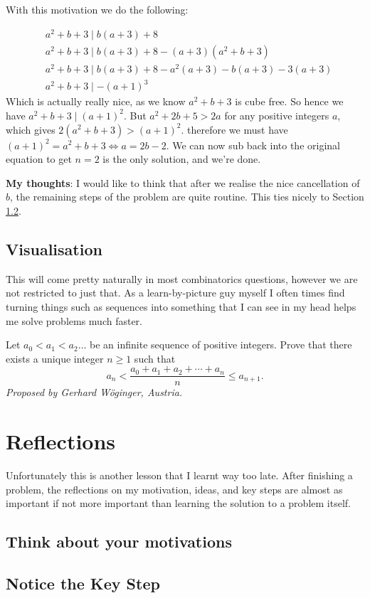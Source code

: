 \documentclass{article}
\theoremstyle{mytheoremstyle}
\theoremstyle{mytheoremstyle}
\theoremstyle{myproblemstyle}
\theoremstyle{myproblemstyle}
\begin{document}
    \begin{center}
    \end{center}

    With this motivation we do the following:

    \begin{align*}
        &a^2 + b + 3 \mid b(a+3) + 8 \\
        &a^2 + b + 3 \mid b(a+3) + 8 - (a+3)(a^2 + b + 3)\\
        &a^2 + b + 3 \mid b(a+3) + 8 - a^2(a+3) - b(a+3) - 3(a+3)\\
        &a^2 + b + 3 \mid -(a+1)^3
    \end{align*}
    Which is actually really nice, as we know $a^2 + b + 3$ is cube free. So hence we have $a^2 + b + 3 \mid (a+1)^2$. But $a^2 + 2b + 5 > 2a$ for any positive integers $a$, which gives $2(a^2 + b + 3) > (a+1)^2$. therefore we must have $(a+1)^2 = a^2 + b + 3 \iff a = 2b - 2$. We can now sub back into the original equation to get $n=2$ is the only solution, and we're done.

    \textbf{My thoughts}: I would like to think that after we realise the nice cancellation of $b$, the remaining steps of the problem are quite routine. This ties nicely to Section \ref{keystep}.

    \subsection{Visualisation}
    This will come pretty naturally in most combinatorics questions, however we are not restricted to just that. As a learn-by-picture guy myself I often times find turning things such as sequences into something that I can see in my head helps me solve problems much faster.

    \begin{example} [ISL 2014 A1]
        Let $a_0 < a_1 < a_2 \ldots$ be an infinite sequence of positive integers. Prove that there exists a unique integer $n\geq 1$ such that \[ a_n < \frac{a_0+a_1+a_2+\cdots+a_n}{n} \leq a_{n+1}. \]
        \textit{Proposed by Gerhard Wöginger, Austria.}
    \end{example}

    \section{Reflections}
    Unfortunately this is another lesson that I learnt way too late. After finishing a problem, the reflections on my motivation, ideas, and key steps are almost as important if not more important than learning the solution to a problem itself. 


    \subsection{Think about your motivations}

    \subsection{Notice the Key Step} \label{keystep}




    

    
    
\end{document}
